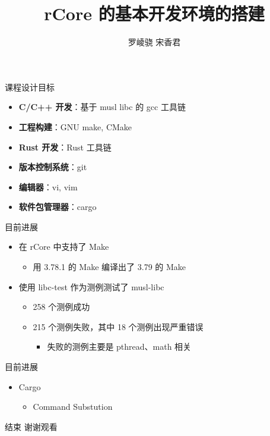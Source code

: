 \documentclass{beamer}
\title{rCore 的基本开发环境的搭建}
\author{罗崚骁 \quad 宋香君}
\begin{document}
\begin{frame}
    \titlepage
\end{frame}

\begin{frame}{课程设计目标}
    \begin{itemize}
        \setlength{\itemsep}{10pt}
        \item \textbf{C/C++ 开发}：基于 musl libc 的 gcc 工具链
        \item \textbf{工程构建}：GNU make, CMake
        \item \textbf{Rust 开发}：Rust 工具链
        \item \textbf{版本控制系统}：git
        \item \textbf{编辑器}：vi, vim
        \item \textbf{软件包管理器}：cargo
    \end{itemize}

\end{frame}

\begin{frame}{目前进展}
    \begin{itemize}
        \setlength{\itemsep}{10pt}
        \item 在 rCore 中支持了 Make
        \begin{itemize}
            \item 用 3.78.1 的 Make 编译出了 3.79 的 Make
        \end{itemize}
        \item 使用 libc-test 作为测例测试了 musl-libc
        \begin{itemize}
            \item 258 个测例成功
            \item 215 个测例失败，其中 18 个测例出现严重错误
            \begin{itemize}
                \item 失败的测例主要是 pthread、math 相关
            \end{itemize}
        \end{itemize}
    \end{itemize}
\end{frame}

\begin{frame}{目前进展}
    \begin{itemize}
        \setlength{\itemsep}{10pt}
        \item Cargo
        \begin{itemize}
            \item Command Substution
        \end{itemize}
    \end{itemize}
\end{frame}



\begin{frame}{结束}
    谢谢观看
\end{frame}
\end{document}
